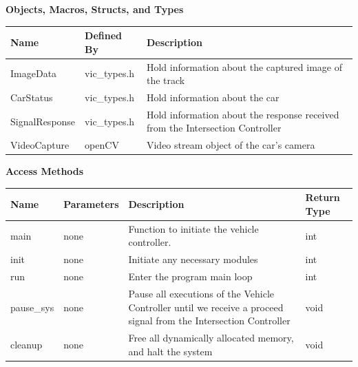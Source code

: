 \documentclass [10pt]{article}
\begin{document}
\textbf{Objects, Macros, Structs, and Types}\\ 
\begin{longtable}{| p{ }  p{ } p{}|} \hline

 \textbf{Name} & \textbf{Defined By} & \textbf{Description} \\ \hline

\rowcolor{tableCell} ImageData & vic\_types.h &  Hold  information about the captured image of the track \\ \hline

CarStatus & vic\_types.h & Hold information about the car  \\ \hline

\rowcolor{tableCell} SignalResponse & vic\_types.h &  Hold  information about the response received from the Intersection Controller \\ \hline

VideoCapture & openCV & Video stream object of the car's camera \\ \hline




\end{longtable}



\textbf{Access Methods} \\ 

\begin{longtable}{ |p{ }  p{ } p{} p{}|} \hline

 \textbf{Name} & \textbf{Parameters} & \textbf{Description} &\textbf{Return Type} \\ \hline
 
\rowcolor{tableCell} main & none & Function to initiate the vehicle controller.
 & int \\ \hline
 
init & none & Initiate any necessary modules &  int \\ \hline

\rowcolor{tableCell} run & none & Enter the program main loop &  int \\ \hline

pause\_sys & none & Pause all executions of the Vehicle Controller until we receive a proceed signal from the Intersection Controller &  void \\ \hline

\rowcolor{tableCell}cleanup & none & Free all dynamically allocated memory, and halt the system  &  void \\ \hline

\end{longtable}
\end{document}
